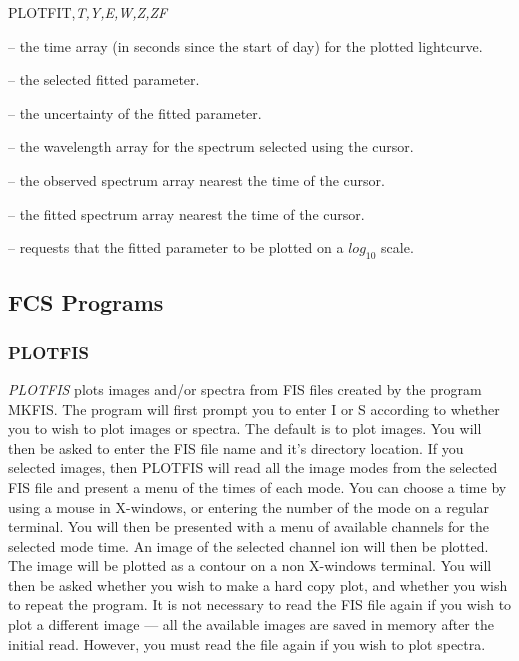 {{{

\noindent PLOTFIT,{\it T,Y,E,W,Z,ZF}



 -- the time array (in seconds since the start of day) for the
plotted lightcurve.

 -- the selected fitted parameter.

 -- the uncertainty of the fitted parameter.

 -- the wavelength array for the spectrum selected using the cursor.

 -- the observed spectrum array nearest the time of the cursor.

 -- the fitted spectrum array nearest the time of the cursor.



 -- requests that the fitted parameter to
be plotted on a $log_{10}$ scale.

\subsection{FCS Programs}

\subsubsection{PLOTFIS}

{\em PLOTFIS} plots images and/or spectra from FIS files  created by the program
MKFIS. The program will first  prompt you to enter I or S according to whether
you to wish to plot images or spectra. The default is  to plot images. You will
then be asked to enter the FIS file name and it's directory location. If you
selected images, then PLOTFIS will read all the image modes from the selected
FIS file and present a menu of the times of each mode. You can choose a time by
using a mouse in X-windows, or entering the number of the mode on a regular
terminal. You will then be presented with a menu of available channels for the
selected mode time. An image of the selected channel ion will then be plotted.
The image will be plotted as a contour on a non X-windows terminal. You will
then be asked whether you wish to make a hard copy plot, and  whether you wish
to repeat the program. It is not necessary to read the FIS file again if you
wish to plot a different image --- all the available images are saved in memory
after the initial read. However, you must read the file again if you wish to
plot spectra.

}}}
